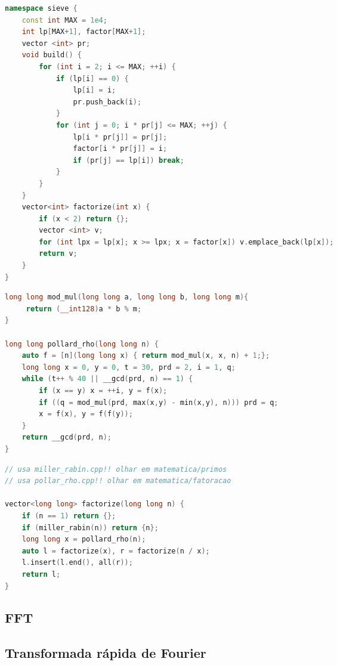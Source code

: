 \documentclass[11pt, a4paper, twoside]{article}
\begin{document}
\begin{lstlisting}[language=C++]
namespace sieve {
    const int MAX = 1e4;
    int lp[MAX+1], factor[MAX+1];
    vector <int> pr;
    void build() {
        for (int i = 2; i <= MAX; ++i) {
            if (lp[i] == 0) {
                lp[i] = i;
                pr.push_back(i);
            }
            for (int j = 0; i * pr[j] <= MAX; ++j) {
                lp[i * pr[j]] = pr[j];
                factor[i * pr[j]] = i;
                if (pr[j] == lp[i]) break;
            }
        }
    }
    vector<int> factorize(int x) {
        if (x < 2) return {};
        vector <int> v;
        for (int lpx = lp[x]; x >= lpx; x = factor[x]) v.emplace_back(lp[x]);
        return v;
    }
}
\end{lstlisting}

\begin{lstlisting}[language=C++]
long long mod_mul(long long a, long long b, long long m){
     return (__int128)a * b % m;
}

long long pollard_rho(long long n) {
	auto f = [n](long long x) { return mod_mul(x, x, n) + 1;};
	long long x = 0, y = 0, t = 30, prd = 2, i = 1, q;
	while (t++ % 40 || __gcd(prd, n) == 1) {
		if (x == y) x = ++i, y = f(x);
		if ((q = mod_mul(prd, max(x,y) - min(x,y), n))) prd = q;
		x = f(x), y = f(f(y));
	}
	return __gcd(prd, n);
}
\end{lstlisting}

\begin{multicols}{2}
\begin{lstlisting}[language=C++]
// usa miller_rabin.cpp!! olhar em matematica/primos
// usa pollar_rho.cpp!! olhar em matematica/fatoracao

vector<long long> factorize(long long n) {
    if (n == 1) return {};
    if (miller_rabin(n)) return {n};
    long long x = pollard_rho(n);
    auto l = factorize(x), r = factorize(n / x);
    l.insert(l.end(), all(r));
    return l;
}
\end{lstlisting}
\end{multicols}

\subsection{FFT}

\subsection{Transformada rápida de Fourier}
\end{document}
